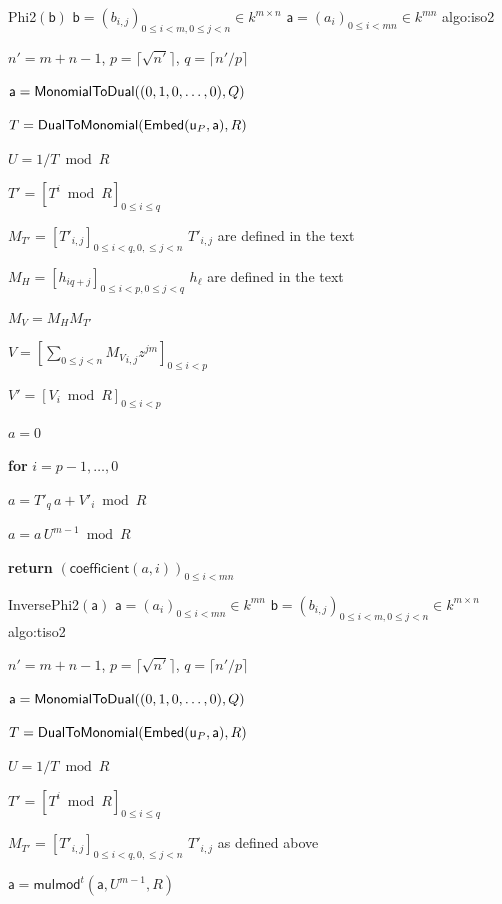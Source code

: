 \documentclass{sig-alternate}
\def\va {\ensuremath{\mathsf{a}}}
\def\vy {\ensuremath{\mathsf{a}}}
\def\vu {\ensuremath{\mathsf{u}}}
\def\vb {\ensuremath{\mathsf{b}}}
\def\coeff {\ensuremath{\mathsf{coefficient}}}
\def\mulmod {\ensuremath{\mathsf{mulmod}}}
\newcounter{algo}
\newenvironment{algorithm_noendline}[4]{\small\begin{center}\begin{minipage}{0.48\textwidth}
      \refstepcounter{algo}
      \label{#4}
      \sf
      \rule{\textwidth}{0.2pt}\\
      \makebox[\textwidth][c]{Algorithm~\arabic{algo}:~\textbf{#1}}\\
      \rule[0.5\baselineskip]{\textwidth}{0.2pt}\\

      \vspace{-12pt}

      \parbox{\textwidth}{\textbf{Input} #2}
      \parbox{\textwidth}{\textbf{Output} #3}

\vspace{-7pt}

      \begin{enumerate*}}{\end{enumerate*}
      \vspace{-11pt}
\end{minipage}\end{center}
}
\newenvironment{algorithm_endline}[4]{\small\begin{center}\begin{minipage}{0.48\textwidth}
      \refstepcounter{algo}
      \label{#4}
      \sf
      \rule{\textwidth}{0.2pt}\\
      \makebox[\textwidth][c]{Algorithm~\arabic{algo}:~\textbf{#1}}\\
      \rule[0.5\baselineskip]{\textwidth}{0.2pt}\\

      \vspace{-12pt}

      \parbox{\textwidth}{\textbf{Input} #2}
      \parbox{\textwidth}{\textbf{Output} #3}

\vspace{-7pt}

      \begin{enumerate*}}{\end{enumerate*}
      \vspace{-11pt}
      \rule{\textwidth}{0.2pt}
\end{minipage}\end{center}
}
\begin{document}
\begin{algofloat}[t]
  \begin{algorithm_noendline}
{Phi2$(\vb)$}      
{$\vb = (b_{i,j})_{0 \le i < m, 0 \le j < n} \in k^{m \times n}$}
{$\va = (a_{i})_{0 \le i < mn} \in k^{m n}$}
{algo:iso2}
\item $n'=m+n-1$, $p=\lceil \sqrt {n'} \rceil$, $q=\lceil n'/p\rceil$
\item $\vy={\sf MonomialToDual}((0,1,0,\dots,0),Q)$ 
\item \label{iso2:2} $T={\sf DualToMonomial}({\sf Embed}(\vu_P, \vy), R)$
\item \label{iso2:3} $U=1/T \bmod R$
\item \label{iso2:4} $T'=[T^i \bmod R]_{0 \le i \le q}$
\item $M_{T'}=[T'_{i,j}]_{0\le i < q, 0, \le j < n}$ \hfill $T'_{i,j}$ are defined in the text
\item $M_H=[h_{iq+j}]_{0 \le i <p, 0 \le j < q}$ \hfill $h_\ell$ are defined in the text
\item \label{iso2:7} $M_V = M_H M_{T'}$
\item $V=[\sum_{0 \le j <n} {M_V}_{i,j} z^{jm} ]_{0 \le i <p}$
\item $V'=[V_i \bmod R]_{0 \le i <p}$
\item $a=0$
\item {\bf for} {$i=p-1,\dots,0$}\label{iso2:11}
\item \hspace{7mm} $a=T'_q\, a+V'_i \bmod R$
\item \label{iso2:14} $a=a\, U^{m-1} \bmod R$
\item {\bf return} $(\coeff(a,i))_{0 \le i < mn}$
  \end{algorithm_noendline}
  \begin{algorithm_endline}
{InversePhi2$(\va)$}
{$\va = (a_{i})_{0 \le i < mn} \in k^{m n}$}
{$\vb = (b_{i,j})_{0 \le i < m, 0 \le j < n} \in k^{m \times n}$}
{algo:tiso2}
\item $n'=m+n-1$, $p=\lceil \sqrt {n'} \rceil$, $q=\lceil n'/p\rceil$
\item $\vy={\sf MonomialToDual}((0,1,0,\dots,0),Q)$ 
\item $T={\sf DualToMonomial}({\sf Embed}(\vu_P, \vy), R)$
\item $U=1/T \bmod R$
\item $T'=[T^i \bmod R]_{0 \le i \le q}$
\item $M_{T'}=[T'_{i,j}]_{0\le i < q, 0, \le j < n}$ \hfill $T'_{i,j}$ as defined above
\item $\va = \mulmod^t(\va, U^{m-1}, R)$

\end{algorithm_endline}
\end{algofloat}
\end{document}
